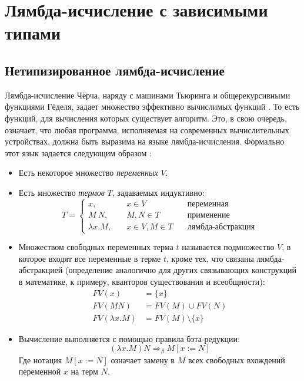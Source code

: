 \section{Лямбда-исчисление с зависимыми типами}

\subsection{Нетипизированное лямбда-исчисление}

Лямбда-исчисление Чёрча, наряду с машинами Тьюринга и общерекурсивными функциями
Гёделя, задает множество эффективно вычислимых функций \cite{lambda-calculus-syntax-and-semantics}.
То есть функций, для вычисления которых существует алгоритм. Это, в свою очередь,
означает, что любая программа, исполняемая на современных вычислительных устройствах,
должна быть выразима на языке лямбда-исчисления. Формально этот язык задается следующим образом
\cite{lambda-calculus-syntax-and-semantics}:
\begin{itemize}
\item Есть некоторое множество \textit{переменных} \(V\).
\item Есть множество \textit{термов} \(T\), задаваемых индуктивно:
   \[
   T = \left\{
   \begin{array}{lrr}
   x,\quad& x \in V\quad&\text{переменная}\\
   M\ N,\quad& M, N \in T\quad&\text{применение}\\
   \lambda x. M,\quad& x \in V, M \in T\quad&\text{лямбда-абстракция}
   \end{array}
   \right.
   \]
\item Множеством свободных переменных терма \(t\) называется подмножество \(V\),
   в которое входят все переменные в терме \(t\), кроме тех, что связаны
   лямбда-абстракцией (определение аналогично для других связывающих
   конструкций в математике, к примеру, кванторов существования и всеобщности):
   \begin{align*}
   FV(x) &= \{x\}\\
   FV(M N) &= FV(M) \cup FV(N)\\
   FV(\lambda x. M) &= FV(M) \setminus \{x\}
   \end{align*}
\item Вычисление выполняется с помощью правила бэта-редукции:
   \[
   (\lambda x. M) N \Rightarrow_\beta M[x := N]
   \]
   Где нотация \(M[x := N]\) означает замену в \(M\) всех свободных вхождений переменной
   \(x\) на терм \(N\).
\end{itemize}

